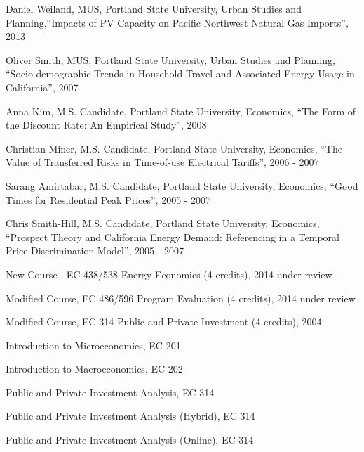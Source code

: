 \documentclass[Computer Science]{vita}
\begin{document}
\begin{vita}
\begin{Instructional Activities}
    \begin{M.S. Thesis Adviser}
    \item Daniel Weiland, MUS, Portland State University,
      Urban Studies and Planning,``Impacts of PV Capacity on Pacific Northwest Natural Gas Imports'', 2013
    
    \item Oliver Smith, MUS, Portland State University,
      Urban Studies and Planning, ``Socio-demographic Trends in
      Household Travel and Associated Energy Usage in California'',
      2007

    \end{M.S. Thesis Adviser}

    \begin{M.S. Project Adviser}
    \item Anna Kim, M.S. Candidate, Portland State University,
      Economics, ``The Form of the Discount Rate: An Empirical
      Study'', 2008

    \item Christian Miner, M.S. Candidate, Portland State University,
      Economics, ``The Value of Transferred Risks in Time-of-use
      Electrical Tariffs'', 2006 - 2007

    \item Sarang Amirtabar, M.S. Candidate, Portland State University,
      Economics, ``Good Times for Residential Peak Prices'', 2005 -
      2007

    \item Chris Smith-Hill, M.S. Candidate, Portland State University,
      Economics, ``Prospect Theory and California Energy Demand:
      Referencing in a Temporal Price Discrimination Model'', 2005 -
      2007
    \end{M.S. Project Adviser}

    \begin{Curriculum Development}
    \item New Course , EC 438/538 Energy Economics (4 credits), 2014 under review
    \item Modified Course, EC 486/596 Program Evaluation (4 credits), 2014 under review
    \item Modified Course, EC 314 Public and Private Investment (4
      credits), 2004
    \end{Curriculum Development}

    \begin{Courses}
    \item Introduction to Microeconomics, EC 201
    \item Introduction to Macroeconomics, EC 202
    \item Public and Private Investment Analysis, EC 314
    \item Public and Private Investment Analysis (Hybrid), EC 314
    \item Public and Private Investment Analysis (Online), EC 314
				

\end{Courses}
\end{Instructional Activities}
\end{vita}
\end{document}
